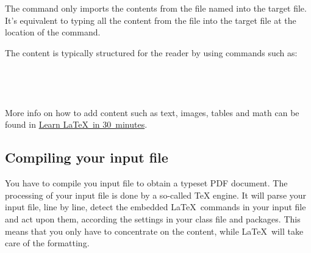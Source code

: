 The command  only imports the contents from the file named  into the target file. It's equivalent to typing all the content from the file  into the target file at the location of the  command.

The content is typically structured for the reader by using commands such as:\\
\\
\\
\\
\\

More info on how to add content such as text, images, tables and math can be found in \href{https://www.overleaf.com/learn/latex/Learn_LaTeX_in_30_minutes}{Learn \LaTeX\ in 30~minutes}.

\subsection{Compiling your input file}
You have to compile you input file to obtain a typeset PDF document. The processing of your input file is done by a so-called TeX engine. It will parse your input file, line by line, detect the embedded \LaTeX\ commands in your input file and act upon them, according the settings in your class file and packages. This means that you only have to concentrate on the content, while \LaTeX\ will take care of the formatting.

